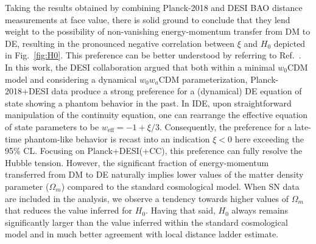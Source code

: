 \documentclass[superscriptaddress,twocolumn,showpacs,a4paper,
amssymb,amsmath,nobibnotes,aps,prl,
showkeys,
nofootinbib,notitlepage]{revtex4-1}
\begin{document}
Taking the results obtained by combining Planck-2018 and DESI BAO distance measurements at face value, there is solid ground to conclude that they lend weight to the possibility of non-vanishing energy-momentum transfer from DM to DE, resulting in the pronounced negative correlation between $\xi$ and $H_0$ depicted in Fig.~\ref{fig:H0}. This preference can be better understood by referring to Ref.~\cite{desicollaboration2024desi}. In this work, the DESI collaboration argued that both  within a minimal $w_0$CDM model and considering a dynamical $w_0w_a$CDM parameterization, Planck-2018+DESI data produce a strong preference for a (dynamical) DE equation of state showing a phantom behavior in the past. In IDE, upon straightforward manipulation of the continuity equation, one can rearrange the effective equation of state parameters to be $w_{\text{eff}} = -1 + \xi/3$. Consequently, the preference for a late-time phantom-like behavior is recast into an indication $\xi < 0$ here exceeding the 95\% CL. Focusing on Planck+DESI(+CC), this preference can fully resolve the Hubble tension. However, the significant fraction of energy-momentum transferred from DM to DE naturally implies lower values of the matter density parameter ($\Omega_m$) compared to the standard cosmological model. When SN data are included in the analysis, we observe a tendency towards higher values of $\Omega_m$ that reduces the value inferred for $H_0$. Having that said, $H_0$ always remains significantly larger than the value inferred within the standard cosmological model and in much better agreement with local distance ladder estimate.
\end{document}
